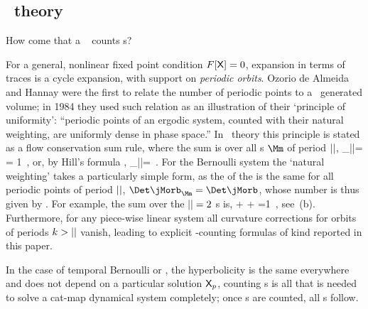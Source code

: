 
\subsection{\Po\ theory}
\label{s:PoThe}

How come that a \HillDet\  counts {\lattstate}s?

For a general, nonlinear fixed point condition $F[\mathsf{X}]=0$, expansion
 in terms of traces is a cycle
expansion, with support on \emph{periodic orbits}.
Ozorio de Almeida and Hannay were the first to relate the
number of periodic points to a \JacobianM\ generated volume; in 1984 they
used such relation as an illustration of their `principle of uniformity':
``periodic points of an ergodic system, counted with their natural
weighting, are uniformly dense in phase space.'' In \po\
theory this principle is stated as a
 {flow
conservation} sum rule, where the sum is over all {\lattstate}s $\Mm$ of
period ${||}$,
\beq
\sum_{|\Mm|=\cl{}}
    \;= 1
\,,
\label{H-OdeA_mapsOrb}
\eeq
or, by Hill's formula ,
\beq
\sum_{|\Mm|=\cl{}}
\,.
\label{Det(jMorb)eights}
\eeq
For the Bernoulli system the `natural weighting' takes a particularly
simple form, as the {\HillDet} of the {\jacobianOrb} is the same for all
periodic points of period ${||}$, $\Det\jMorb_\Mm=\Det\jMorb$, whose
number is thus given by \refeq{LC21detBern}.
For example, the sum over the ${||}=2$ {\lattstate}s is,
\beq
   +    
   + 
    =1
\,,
see \,(b).
Furthermore, for any piece-wise
linear system all curvature corrections for orbits of
periods $k>{||}$ vanish, leading to explicit {\lattstate}-counting
formulas of kind reported in this paper.

In the case of temporal Bernoulli or \templatt, the hyperbolicity is the same
everywhere and does not depend on a particular solution $\mathsf{X}_p$, counting
\po s is all that is needed to solve a cat-map dynamical system
completely; once \po s are counted, all {\cycForm s}\rf{CBtrace} follow.

